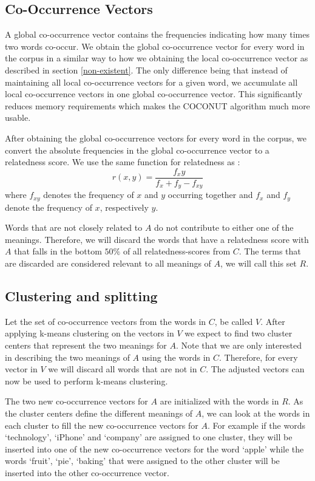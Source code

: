 \documentclass[11pt]{article}
\begin{document}
\subsection{Co-Occurrence Vectors}
A global co-occurrence vector contains the frequencies indicating how many times two words co-occur. We obtain the global co-occurrence vector for every word in the corpus in a similar way to how we obtaining the local co-occurrence vector as described in section \ref{non-existent}. The only difference being that instead of maintaining all local co-occurrence vectors for a given word, we accumulate all local co-occurrence vectors in one global co-occurrence vector. This significantly reduces memory requirements which makes the COCONUT algorithm much more usable. 

After obtaining the global co-occurrence vectors for every word in the corpus, we convert the absolute frequencies in the global co-occurrence vector to a relatedness score. We use the same function for relatedness as \cite{relatedness}:
$$r(x, y) = \frac{f_xy}{f_x+f_y - f_{xy}}$$
where $f_{xy}$ denotes the frequency of $x$ and $y$ occurring together and $f_x$ and $f_y$ denote the frequency of $x$, respectively $y$. 

Words that are not closely related to $A$ do not contribute to either one of the meanings. Therefore, we will discard the words that have a relatedness score with $A$ that falls in the bottom $50\%$ of all relatedness-scores from $C$. The terms that are discarded are considered relevant to all meanings of $A$, we will call this set $R$.

\subsection{Clustering and splitting}
Let the set of co-occurrence vectors from the words in $C$, be called $V$. After applying k-means clustering on the vectors in $V$ we expect to find two cluster centers that represent the two meanings for $A$. Note that we are only interested in describing the two meanings of $A$ using the words in $C$. Therefore, for every vector in $V$ we will discard all words that are not in $C$. The adjusted vectors can now be used to perform k-means clustering. 

The two new co-occurrence vectors for $A$ are initialized with the words in $R$. As the cluster centers define the different meanings of $A$, we can look at the words in each cluster to fill the new co-occurrence vectors for $A$. For example if the words `technology', `iPhone' and `company' are assigned to one cluster, they will be inserted into one of the new co-occurrence vectors for the word `apple' while the words `fruit', `pie', `baking' that were assigned to the other cluster will be inserted into the other co-occurrence vector. 
\end{document}
